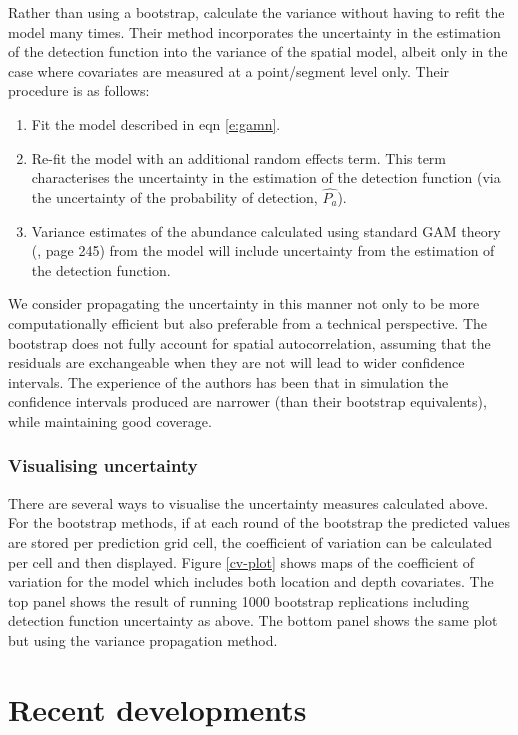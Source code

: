 \documentclass[a4paper,12pt]{article}
\begin{document}
Rather than using a bootstrap, \cite{WILLIAMS:2011in} calculate the variance without having to refit the model many times.  Their method incorporates the uncertainty in the estimation of the detection function into the variance of the spatial model, albeit only in the case where covariates are measured at a point/segment level only. Their procedure is as follows:
\begin{enumerate}
\item Fit the model described in eqn \ref{e:gamn}.
\item Re-fit the model with an additional random effects term. This term characterises the uncertainty in the estimation of the detection function (via the uncertainty of the probability of detection, $\hat{P_a}$).
\item Variance estimates of the abundance calculated using standard GAM theory (\cite{Wood:2006wz}, page 245) from the model will include uncertainty from the estimation of the detection function.
\end{enumerate}
We consider propagating the uncertainty in this manner not only to be more computationally efficient but also preferable from a technical perspective. The bootstrap does not fully account for spatial autocorrelation, assuming that the residuals are exchangeable when they are not will lead to wider confidence intervals. The experience of the authors has been that in simulation  the confidence intervals produced are narrower (than their bootstrap equivalents), while maintaining good coverage.


\subsubsection*{Visualising uncertainty}

There are several ways to visualise the uncertainty measures calculated above. For the bootstrap methods, if at each round of the bootstrap the predicted values are stored per prediction grid cell, the coefficient of variation can be calculated per cell and then displayed. Figure \ref{cv-plot} shows maps of the coefficient of variation for the model which includes both location and depth covariates. The top panel shows the result of running 1000 bootstrap replications including detection function uncertainty as above. The bottom panel shows the same plot but using the variance propagation method.


\section*{Recent developments}
\label{s:recentadvances}
\end{document}

